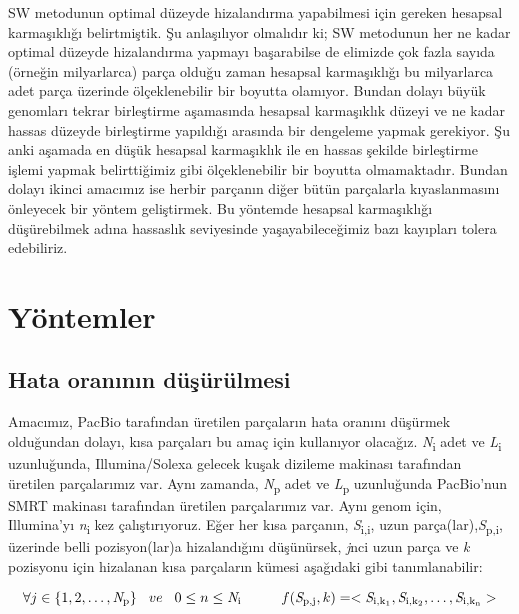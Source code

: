 SW metodunun optimal düzeyde hizalandırma yapabilmesi için gereken hesapsal karmaşıklığı belirtmiştik. Şu anlaşılıyor olmalıdır ki; SW metodunun her ne kadar optimal düzeyde hizalandırma yapmayı başarabilse de elimizde çok fazla sayıda (örneğin milyarlarca) parça olduğu zaman hesapsal karmaşıklığı bu milyarlarca adet parça üzerinde ölçeklenebilir bir boyutta olamıyor. Bundan dolayı büyük genomları tekrar birleştirme aşamasında hesapsal karmaşıklık düzeyi ve ne kadar hassas düzeyde birleştirme yapıldığı arasında bir dengeleme yapmak gerekiyor. Şu anki aşamada en düşük hesapsal karmaşıklık ile en hassas şekilde birleştirme işlemi yapmak belirttiğimiz gibi ölçeklenebilir bir boyutta olmamaktadır. Bundan dolayı ikinci amacımız ise herbir parçanın diğer bütün parçalarla kıyaslanmasını önleyecek bir yöntem geliştirmek. Bu yöntemde hesapsal karmaşıklığı düşürebilmek adına hassaslık seviyesinde yaşayabileceğimiz bazı kayıpları tolera edebiliriz.

\section{Yöntemler}
\subsection{Hata oranının düşürülmesi}
Amacımız, PacBio tarafından üretilen parçaların hata oranını düşürmek olduğundan dolayı, kısa parçaları bu amaç için kullanıyor olacağız. \textit{N}\textsubscript{i} adet ve \textit{L}\textsubscript{i} uzunluğunda, Illumina/Solexa gelecek kuşak dizileme makinası tarafından üretilen parçalarımız var. Aynı zamanda, \textit{N}\textsubscript{p} adet ve \textit{L}\textsubscript{p} uzunluğunda PacBio'nun SMRT makinası tarafından üretilen parçalarımız var. Aynı genom için, Illumina'yı \textit{n}\textsubscript{i} kez çalıştırıyoruz. Eğer her kısa parçanın, \textit{S}\textsubscript{i,i}, uzun parça(lar),\textit{S}\textsubscript{p,i}, üzerinde belli pozisyon(lar)a hizalandığını düşünürsek, \textit{j}nci uzun parça ve \textit{k} pozisyonu için hizalanan kısa parçaların kümesi aşağıdaki gibi tanımlanabilir:

\begin{equation} \label{eq1}
\forall j \in \{1,2, \dots, \textit{N}\textsubscript{p}\} \hspace{0.3cm} ve \hspace{0.3cm}  0 \leq n \leq \textit{N}\textsubscript{i} \hspace{1cm}  f(\textit{S}\textsubscript{p,j}, k) = <\textit{S}\textsubscript{i,k\textsubscript{1}}, \textit{S}\textsubscript{i,k\textsubscript{2}}, \dots, \textit{S}\textsubscript{i,k\textsubscript{n}}>
\end{equation}

